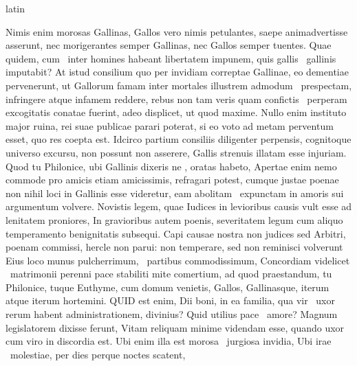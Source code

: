 \documentclass[12pt]{book}
\renewenvironment{latin}
    	{\begin{hyphenrules}{latin}}
    	{\end{hyphenrules}}
\begin{document}
\begin{pages}
\begin{latin}
\begin{Leftside}
                    Nimis enim morosas Gallinas, Gallos vero nimis petulantes, saepe animadvertisse asserunt, nec morigerantes semper Gallinas, nec Gallos semper tuentes. 
                    Quae quidem, cum ﻿\ampersand\ inter homines habeant libertatem impunem, quis gallis ﻿\ampersand\ gallinis imputabit? 
                    At istud consilium quo per invidiam correptae Gallinae, eo dementiae pervenerunt, 
                    ut Gallorum famam inter mortales illustrem admodum ﻿\ampersand\ prespectam, 
                    infringere atque infamem reddere, rebus non tam veris quam confictis ﻿\ampersand\ perperam excogitatis conatae fuerint, adeo displicet, 
                    ut quod maxime. 
                    Nullo enim instituto major ruina, rei suae publicae parari poterat, si eo voto ad metam perventum esset, quo res coepta est. 
                    Idcirco partium consiliis diligenter perpensis, cognitoque universo  excursu, non possunt non asserere, Gallis strenuis illatam esse injuriam. 
                    Quod tu Philonice, ubi Gallinis dixeris ne , oratas habeto, 
                    Apertae enim  nemo commode pro   amicis etiam amicissimis, refragari potest, cumque justae poenae non nihil loci in Gallinis esse videretur, 
                    eam abolitam ﻿\ampersand\ expunctam in amoris sui argumentum volvere. 
                    Novistis legem, quae Iudices in levioribus causis vult esse ad lenitatem proniores, 
                    In gravioribus autem poenis, severitatem legum cum aliquo temperamento benignitatis subsequi. 
                    Capi causae nostra non judices sed Arbitri, poenam commissi, hercle non parui: 
                    non temperare, sed non reminisci volverunt Eius loco munus  pulcherrimum, ﻿\ampersand\ partibus commodissimum, 
                    Concordiam videlicet ﻿\ampersand\ matrimonii perenni pace stabiliti mite comertium, 
                    ad quod praestandum, tu Philonice, tuque Euthyme, cum domum venietis, Gallos, Gallinasque, iterum atque iterum hortemini. 
                    QUID est enim, Dii boni, in ea familia, qua vir ﻿\ampersand\ uxor rerum habent administrationem, divinius? 
                    Quid utilius pace ﻿\ampersand\ amore? 
                    Magnum legislatorem dixisse ferunt, Vitam reliquam minime videndam esse, quando uxor cum viro in discordia est. 
                    Ubi enim illa est morosa ﻿\ampersand\ jurgiosa invidia, Ubi irae ﻿\ampersand\ molestiae, per dies perque noctes scatent, 

\end{Leftside}
\end{latin}
\end{pages}
\end{document}
